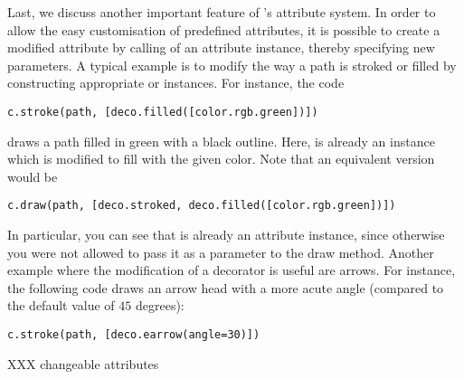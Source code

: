 Last, we discuss another important feature of \PyX's attribute system.
In order to allow the easy customisation of predefined attributes, it
is possible to create a modified attribute by calling of an attribute
instance, thereby specifying new parameters. A typical example is to
modify the way a path is stroked or filled by constructing appropriate
 or  instances.
For instance, the code
\begin{verbatim}
c.stroke(path, [deco.filled([color.rgb.green])])
\end{verbatim}
draws a path filled in green with a black outline. Here,
 is already an instance which is modified to fill 
with the given color. Note that an equivalent version would
be
\begin{verbatim}
c.draw(path, [deco.stroked, deco.filled([color.rgb.green])])
\end{verbatim}
In particular, you can see that  is already an
attribute instance, since otherwise you were not allowed to pass
it as a parameter to the draw method. Another example where 
the modification of a decorator is useful are arrows. For instance, the following
code draws an arrow head with a more acute angle (compared to the
default value of $45$ degrees):
\begin{verbatim}
c.stroke(path, [deco.earrow(angle=30)])
\end{verbatim}


XXX changeable attributes